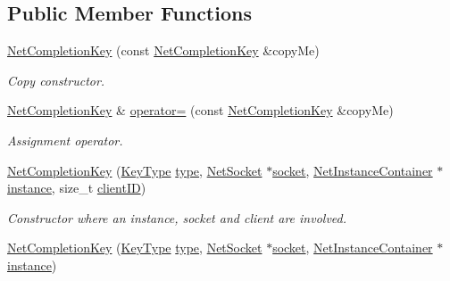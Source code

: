 \subsection*{Public Member Functions}
\begin{DoxyCompactItemize}
\item 
\hyperlink{class_net_completion_key_af4d410a45652629a872d60fcd0c51830}{NetCompletionKey} (const \hyperlink{class_net_completion_key}{NetCompletionKey} \&copyMe)
\begin{DoxyCompactList}\small\item\em Copy constructor. \item\end{DoxyCompactList}\item 
\hyperlink{class_net_completion_key}{NetCompletionKey} \& \hyperlink{class_net_completion_key_a6c86ff06a4ba68928c41bb834bd692d5}{operator=} (const \hyperlink{class_net_completion_key}{NetCompletionKey} \&copyMe)
\begin{DoxyCompactList}\small\item\em Assignment operator. \item\end{DoxyCompactList}\item 
\hyperlink{class_net_completion_key_acfd34caa2a00c859b8ca733804cafd1b}{NetCompletionKey} (\hyperlink{class_net_completion_key_a129b5d89d5f2ac58abcc9872adc85d32}{KeyType} \hyperlink{class_net_completion_key_ab688ca4ac39575c1e1edecbd7fe09a10}{type}, \hyperlink{class_net_socket}{NetSocket} $\ast$\hyperlink{class_net_completion_key_ae4108c1fd628613e8b36eb8d11ac4f5e}{socket}, \hyperlink{class_net_instance_container}{NetInstanceContainer} $\ast$\hyperlink{class_net_completion_key_a8f408ea2a3985e19cf3381fcbcae3318}{instance}, size\_\-t \hyperlink{class_net_completion_key_a36d25bfffcd6bb9adad4c243cd4430e0}{clientID})
\begin{DoxyCompactList}\small\item\em Constructor where an instance, socket and client are involved. \item\end{DoxyCompactList}\item 
\hyperlink{class_net_completion_key_accb8bc66c6723269fd3bb7c1e74b523b}{NetCompletionKey} (\hyperlink{class_net_completion_key_a129b5d89d5f2ac58abcc9872adc85d32}{KeyType} \hyperlink{class_net_completion_key_ab688ca4ac39575c1e1edecbd7fe09a10}{type}, \hyperlink{class_net_socket}{NetSocket} $\ast$\hyperlink{class_net_completion_key_ae4108c1fd628613e8b36eb8d11ac4f5e}{socket}, \hyperlink{class_net_instance_container}{NetInstanceContainer} $\ast$\hyperlink{class_net_completion_key_a8f408ea2a3985e19cf3381fcbcae3318}{instance})

\end{DoxyCompactItemize}
